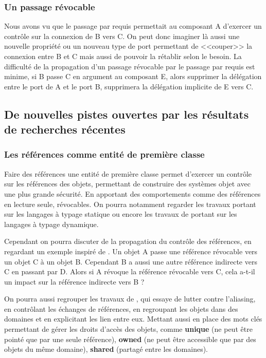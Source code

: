       \subsubsection{Un passage révocable}
    
    Nous avons vu que le passage par requis permettait au composant A d'exercer un contrôle sur la connexion de B vers C. On peut donc imaginer là aussi une nouvelle propriété ou un nouveau type de port permettant de <<couper>> la connexion entre B et C mais aussi de pouvoir la rétablir selon le besoin. La difficulté de la propagation d'un passage révocable par le passage par requis est minime, si B passe C en argument au composant E, alors supprimer la délégation entre le port de A et le port B, supprimera la délégation implicite de E vers C. \\\par
    
  \subsection{De nouvelles pistes ouvertes par les résultats de recherches récentes}
  
    \subsubsection{Les références comme entité de première classe}
    
    Faire des références une entité de première classe permet d'exercer un contrôle sur les références des objets, permettant de construire des systèmes objet avec une plus grande sécurité. En apportant des comportements comme des références en lecture seule, révocables. On pourra notamment regarder les travaux portant sur les langages à typage statique \cite{DBLP:conf/oopsla/ClarkePN98} ou encore les travaux de \cite{DBLP:journals/scp/ArnaudDDT15} portant sur les langages à typage dynamique. 
    
    Cependant on pourra discuter de la propagation du contrôle des références, en regardant un exemple inspiré de \cite{DBLP:journals/scp/ArnaudDDT15}. Un objet A passe une référence révocable vers un objet C à un objet B. Cependant B a aussi une autre référence indirecte vers C en passant par D. Alors si A révoque la référence révocable vers C, cela a-t-il un impact sur la référence indirecte vers B ?
    
    On pourra aussi regrouper les travaux de \cite{DBLP:conf/oopsla/Abi-AntounA06}, qui essaye de lutter contre l'aliasing, en contrôlant les échanges de références, en regroupant les objets dans des domaines et en explicitant les lien entre eux. Mettant aussi en place des mots clés permettant de gérer les droits d'accès des objets, comme \textbf{unique} (ne peut être pointé que par une seule référence), \textbf{owned} (ne peut être accessible que par des objets du même domaine), \textbf{shared} (partagé entre les domaines).
    
